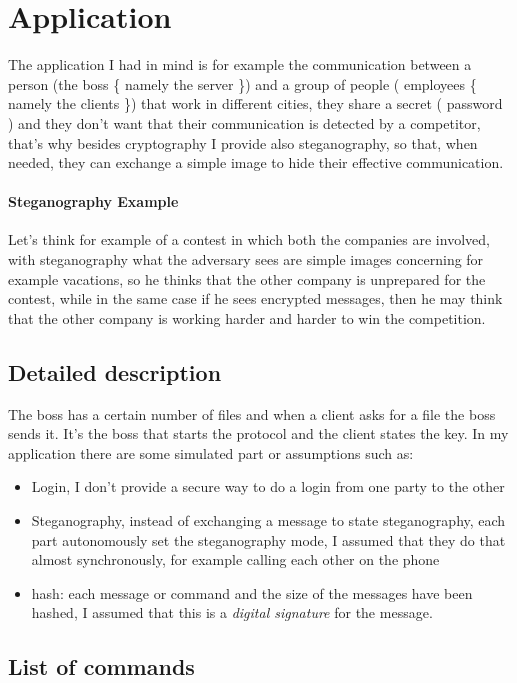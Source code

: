 \chapter{Application}

The application I had in mind is for example the communication between a person (the boss \{ namely the server \}) and a group of people ( employees \{ namely the clients \}) that work in different cities, they share a secret ( password ) and they don't want that their communication is detected by a competitor, that's why besides cryptography I provide also steganography, so that, when needed, they can exchange a simple image to hide their effective communication.
\subsubsection{Steganography Example}
Let's think for example of a contest in which both the companies are involved, with steganography what the adversary sees are simple images concerning for example vacations, so he thinks that the other company is unprepared for the contest, while in the same case if he sees encrypted messages, then he may think that the other company is working harder and harder to win the competition. 

\section{Detailed description}
The boss has a certain number of files and when a client asks for a file the boss sends it.
It's the boss that starts the protocol and the client states the key. 
In my application there are some simulated part or assumptions such as: 
\begin{itemize}
	\item Login, I don't provide a secure way to do a login from one party to the 	other
	\item Steganography, instead of exchanging a message to state steganography, each part autonomously set the steganography
	 mode, I assumed that they do that almost synchronously, for example calling each other on the phone
	 \item hash: each message or command and the size of the messages have been hashed, I assumed that this is a \emph{digital signature} for the message.
\end{itemize}

\section{List of commands}
